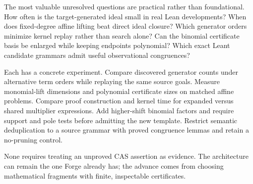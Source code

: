 The most valuable unresolved questions are practical rather than foundational.
How often is the target-generated ideal small in real Lean developments? When
does fixed-degree affine lifting beat direct ideal closure? Which generator
orders minimize kernel replay rather than search alone? Can the binomial
certificate basis be enlarged while keeping endpoints polynomial? Which exact
Leant candidate grammars admit useful observational congruences?

Each has a concrete experiment. Compare discovered generator counts under
alternative term orders while replaying the same source goals. Measure
monomial-lift dimensions and polynomial certificate sizes on matched affine
problems. Compare proof construction and kernel time for expanded versus shared
multiplier expressions. Add higher-shift binomial factors and require support
and pole tests before admitting the new template. Restrict semantic deduplication
to a source grammar with proved congruence lemmas and retain a no-pruning control.

None requires treating an unproved CAS assertion as evidence. The architecture
can remain the one Forge already has; the advance comes from choosing
mathematical fragments with finite, inspectable certificates.
